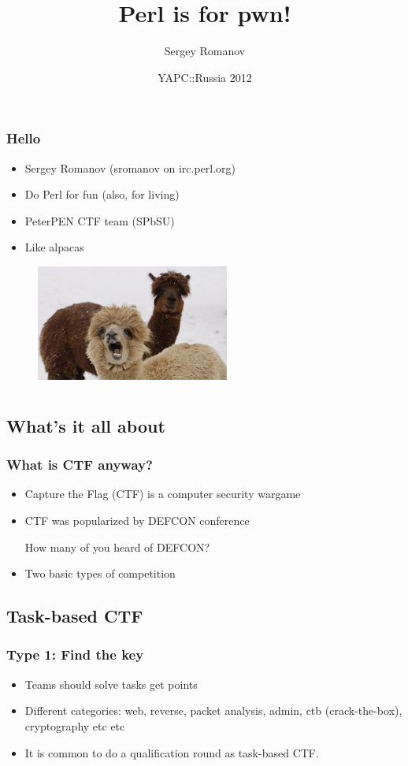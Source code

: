 \documentclass{beamer}
\title{Perl is for pwn!}
\author{Sergey Romanov}
\date{YAPC::Russia 2012}
\begin{document}
\frame{\titlepage}

\frame
{
\frametitle{Hello}
\begin{itemize}
\item Sergey Romanov (sromanov on irc.perl.org)
\item Do Perl for fun (also, for living)
\item PeterPEN CTF team (SPbSU)
\item Like alpacas
\end{itemize}
\begin{figure}
\includegraphics[width=2.5in,height=1.5in]{pics/alpacas.jpg}
\end{figure}
}

\section[CTF]{}

\subsection{What's it all about}
\frame
{
\frametitle{What is CTF anyway?}
\begin{itemize}
\item<1-> Capture the Flag (CTF) is a computer security wargame
\item<2-> CTF was popularized by DEFCON conference
\linebreak

{\Large How many of you heard of DEFCON?}
\item<3-> Two basic types of competition
\end{itemize}
}

\subsection{Task-based CTF}
\frame
{
\frametitle{Type 1: Find the key}
\begin{itemize}
\item Teams should solve tasks get points
\item Different categories: web, reverse, packet analysis, admin, ctb (crack-the-box), cryptography etc etc
\item It is common to do a qualification round as task-based CTF.
\end{itemize}
}
\end{document}
